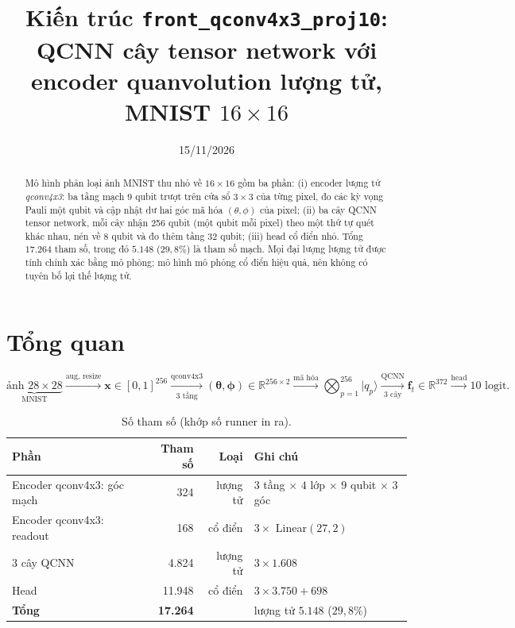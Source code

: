 \documentclass[11pt,a4paper]{article}
\title{Kiến trúc \texttt{front\_qconv4x3\_proj10}:\\
QCNN cây tensor network với encoder quanvolution lượng tử,\\ MNIST $16\times16$}
\author{}
\date{15/11/2026}
\newcommand{\ket}[1]{\lvert #1 \rangle}
\newcommand{\RR}{\mathbb{R}}
\begin{document}
\maketitle

\begin{abstract}
Mô hình phân loại ảnh MNIST thu nhỏ về $16\times16$ gồm ba phần: (i) encoder lượng tử \emph{qconv4x3}:
ba tầng mạch 9 qubit trượt trên cửa sổ $3\times3$ của từng pixel, đo các kỳ vọng Pauli một qubit và cập nhật
dư hai góc mã hóa $(\theta,\phi)$ của pixel; (ii) ba cây QCNN tensor network, mỗi cây nhận 256 qubit (một qubit mỗi
pixel) theo một thứ tự quét khác nhau, nén về 8 qubit và đo thêm tầng 32 qubit; (iii) head cổ điển nhỏ.
Tổng $17.264$ tham số, trong đó $5.148$ ($29{,}8\%$) là tham số mạch. Mọi đại lượng lượng tử được tính chính xác
bằng mô phỏng; mô hình mô phỏng cổ điển hiệu quả, nên không có tuyên bố lợi thế lượng tử.
\end{abstract}

\tableofcontents

\section{Tổng quan}

\begin{equation*}
\underbrace{\text{ảnh } 28{\times}28}_{\text{MNIST}}
\xrightarrow{\text{aug, resize}} \bm{x}\in[0,1]^{256}
\xrightarrow[\text{3 tầng}]{\text{qconv4x3}} (\bm{\theta},\bm{\phi})\in\RR^{256\times2}
\xrightarrow{\text{mã hóa}} \bigotimes_{p=1}^{256}\ket{q_p}
\xrightarrow[\text{3 cây}]{\text{QCNN}} \bm{f}_t\in\RR^{372}
\xrightarrow{\text{head}} \text{10 logit}.
\end{equation*}

\begin{table}[htbp]\centering
\caption{Số tham số (khớp số runner in ra).}
\begin{tabular}{lrrl}
\toprule
Phần & Tham số & Loại & Ghi chú \\
\midrule
Encoder qconv4x3: góc mạch & 324 & lượng tử & $3$ tầng $\times$ $4$ lớp $\times$ $9$ qubit $\times$ $3$ góc \\
Encoder qconv4x3: readout & 168 & cổ điển & $3 \times$ Linear$(27,2)$ \\
3 cây QCNN & 4.824 & lượng tử & $3\times1.608$ \\
Head & 11.948 & cổ điển & $3\times3.750 + 698$ \\
\midrule
\textbf{Tổng} & \textbf{17.264} & & lượng tử $5.148$ ($29{,}8\%$) \\
\bottomrule
\end{tabular}
\end{table}
\end{document}
